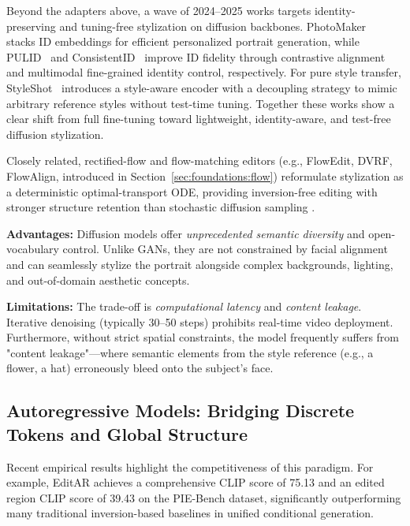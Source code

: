 \documentclass[journal]{IEEEtran}
\begin{document}
Beyond the adapters above, a wave of 2024--2025 works targets identity-preserving and tuning-free stylization on diffusion backbones. PhotoMaker~\cite{li2024photomaker} stacks ID embeddings for efficient personalized portrait generation, while PULID~\cite{guo2024pulid} and ConsistentID~\cite{huang2024consistentid} improve ID fidelity through contrastive alignment and multimodal fine-grained identity control, respectively. For pure style transfer, StyleShot~\cite{gao2024styleshot} introduces a style-aware encoder with a decoupling strategy to mimic arbitrary reference styles without test-time tuning. Together these works show a clear shift from full fine-tuning toward lightweight, identity-aware, and test-free diffusion stylization.

Closely related, rectified-flow and flow-matching editors (e.g., FlowEdit, DVRF, FlowAlign, introduced in Section~\ref{sec:foundations:flow}) reformulate stylization as a deterministic optimal-transport ODE, providing inversion-free editing with stronger structure retention than stochastic diffusion sampling \cite{flowedit2025,dvrf2025,flowalign2025}.

\textbf{Advantages:} Diffusion models offer \textit{unprecedented semantic diversity} and open-vocabulary control. Unlike GANs, they are not constrained by facial alignment and can seamlessly stylize the portrait alongside complex backgrounds, lighting, and out-of-domain aesthetic concepts.

\textbf{Limitations:} The trade-off is \textit{computational latency} and \textit{content leakage}. Iterative denoising (typically 30--50 steps) prohibits real-time video deployment. Furthermore, without strict spatial constraints, the model frequently suffers from "content leakage"—where semantic elements from the style reference (e.g., a flower, a hat) erroneously bleed onto the subject's face.

\subsection{Autoregressive Models: Bridging Discrete Tokens and Global Structure}
\label{sec:methodology:ar}

Recent empirical results highlight the competitiveness of this paradigm. For example, EditAR \cite{mu2025editar} achieves a comprehensive CLIP score of 75.13 and an edited region CLIP score of 39.43 on the PIE-Bench dataset, significantly outperforming many traditional inversion-based baselines in unified conditional generation.
\end{document}
